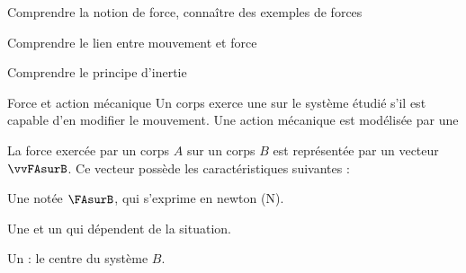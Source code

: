 \sndEnTeteDeux




\begin{objectifs}
  \item Comprendre la notion de force, connaître des exemples de forces
  \item Comprendre le lien entre mouvement et force
  \item Comprendre le principe d'inertie
\end{objectifs}
\bigskip


\begin{doc}{Force et action mécanique}
  \label{doc:action_force_comp}
  \chevron Un corps exerce une  sur le système étudié s’il est capable d’en modifier le mouvement.
  Une action mécanique est modélisée par une 

  \begin{encart}
    La force exercée par un corps $A$ sur un corps $B$ est représentée par un vecteur $\vvFAsurB$.
    Ce vecteur possède les caractéristiques suivantes :
    \begin{listePoints}
      \item Une  notée $\FAsurB$, qui s'exprime en newton (N).
      \item Une  et un  qui dépendent de la situation.
      \item Un  : le centre du système $B$.
    \end{listePoints}
  \end{encart}
\end{doc}
\bigskip


